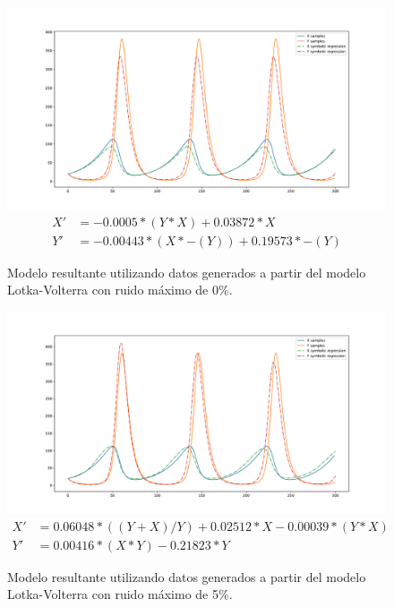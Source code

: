 \begin{figure}[h]
    \centering
    \includegraphics[width=\textwidth]{"figures/final_plot_LV_0.0.pdf"}
    \begin{align*}
        X' & = -0.0005 * (Y * X) + 0.03872 * X        \\
        Y' & = -0.00443 * (X * -(Y)) + 0.19573 * -(Y)
    \end{align*}
    \caption{Modelo resultante utilizando datos generados a partir del modelo Lotka-Volterra con ruido máximo de 0\%.
    }
    \label{fig:final_plot_LV_0.0}
\end{figure}

\begin{figure}[h]
    \centering
    \includegraphics[width=\textwidth]{"figures/final_plot_LV_0.05.pdf"}
    \begin{align*}
        X' & = 0.06048 * ((Y + X) / Y) + 0.02512 * X -0.00039 * (Y * X) \\
        Y' & = 0.00416 * (X * Y) -0.21823 * Y
    \end{align*}
    \caption{Modelo resultante utilizando datos generados a partir del modelo Lotka-Volterra con ruido máximo de 5\%.}
    \label{fig:final_plot_LV_0.05}
\end{figure}

